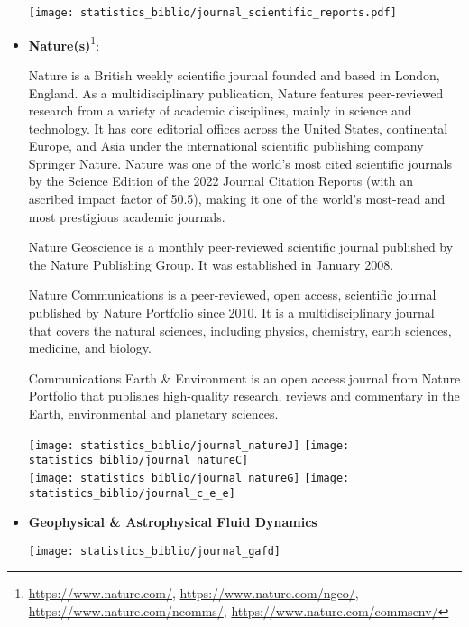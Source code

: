\begin{itemize}
\begin{center}
\texttt{[image: statistics\_biblio/journal\_scientific\_reports.pdf]}
\end{center}

\item {\bf Nature(s)}\footnote{
\url{https://www.nature.com/},
\url{https://www.nature.com/ngeo/},
\url{https://www.nature.com/ncomms/},
\url{https://www.nature.com/commsenv/}
}:

Nature is a British weekly scientific journal founded and based in London, England. 
As a multidisciplinary publication, Nature features peer-reviewed research from a variety of 
academic disciplines, mainly in science and technology. It has core editorial offices across the 
United States, continental Europe, and Asia under the international scientific publishing company 
Springer Nature. Nature was one of the world's most cited scientific journals by the Science Edition 
of the 2022 Journal Citation Reports (with an ascribed impact factor of 50.5), making it one of the world's most-read and most prestigious academic journals.

Nature Geoscience is a monthly peer-reviewed scientific journal published by the Nature Publishing Group. 
It was established in January 2008. 

Nature Communications is a peer-reviewed, open access, scientific journal published by Nature Portfolio since 2010. 
It is a multidisciplinary journal that covers the natural sciences, including physics, chemistry, earth sciences, 
medicine, and biology.

Communications Earth \& Environment is an open access journal from Nature Portfolio that publishes 
high-quality research, reviews and commentary in the Earth, environmental and planetary sciences. 

\begin{center}
\texttt{[image: statistics\_biblio/journal\_natureJ]}
\texttt{[image: statistics\_biblio/journal\_natureC]}\\
\texttt{[image: statistics\_biblio/journal\_natureG]}
\texttt{[image: statistics\_biblio/journal\_c\_e\_e]}
\end{center}

\item {\bf Geophysical \& Astrophysical Fluid Dynamics} 

\begin{center}
\texttt{[image: statistics\_biblio/journal\_gafd]}
\end{center}

 



\end{itemize}




